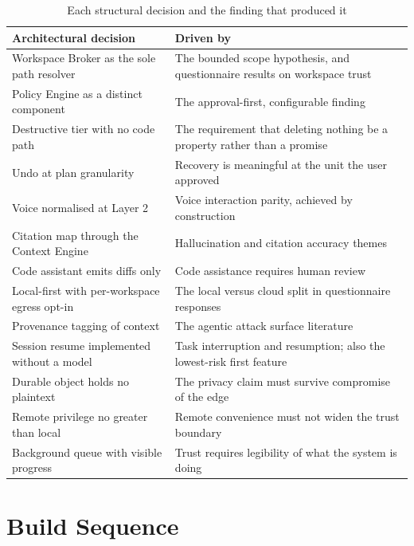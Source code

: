 \documentclass[11pt]{article}
\begin{document}
\begin{table}[htbp]
\centering
\small
\caption{Each structural decision and the finding that produced it}
\label{tab:traceability}
\begin{tabular}{@{}p{}p{}@{}}
\toprule
\textbf{Architectural decision} & \textbf{Driven by} \\
\midrule
Workspace Broker as the sole path resolver & The bounded scope hypothesis, and questionnaire results on workspace trust \\
\addlinespace
Policy Engine as a distinct component & The approval-first, configurable finding \\
\addlinespace
Destructive tier with no code path & The requirement that deleting nothing be a property rather than a promise \\
\addlinespace
Undo at plan granularity & Recovery is meaningful at the unit the user approved \\
\addlinespace
Voice normalised at Layer 2 & Voice interaction parity, achieved by construction \\
\addlinespace
Citation map through the Context Engine & Hallucination and citation accuracy themes \\
\addlinespace
Code assistant emits diffs only & Code assistance requires human review \\
\addlinespace
Local-first with per-workspace egress opt-in & The local versus cloud split in questionnaire responses \\
\addlinespace
Provenance tagging of context & The agentic attack surface literature \\
\addlinespace
Session resume implemented without a model & Task interruption and resumption; also the lowest-risk first feature \\
\addlinespace
Durable object holds no plaintext & The privacy claim must survive compromise of the edge \\
\addlinespace
Remote privilege no greater than local & Remote convenience must not widen the trust boundary \\
\addlinespace
Background queue with visible progress & Trust requires legibility of what the system is doing \\
\bottomrule
\end{tabular}
\end{table}

\section{Build Sequence}
\end{document}
